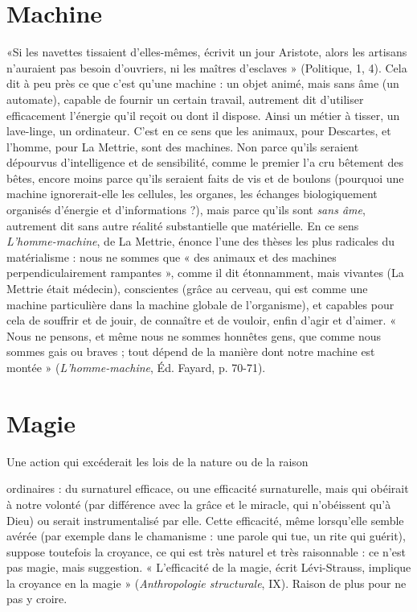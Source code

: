 \section{Machine}
«Si les navettes tissaient d’elles-mêmes, écrivit un jour Aristote,
alors les artisans n'auraient pas besoin d’ouvriers, ni les
maîtres d'esclaves » (Politique, 1, 4). Cela dit à peu près ce que c’est qu’une
machine : un objet animé, mais sans âme (un automate), capable de fournir un
certain travail, autrement dit d’utiliser efficacement l'énergie qu’il reçoit ou
dont il dispose. Ainsi un métier à tisser, un lave-linge, un ordinateur. C’est en
ce sens que les animaux, pour Descartes, et l’homme, pour La Mettrie, sont des
machines. Non parce qu’ils seraient dépourvus d’intelligence et de sensibilité,
comme le premier l’a cru bêtement des bêtes, encore moins parce qu’ils seraient
faits de vis et de boulons (pourquoi une machine ignorerait-elle les cellules, les
organes, les échanges biologiquement organisés d'énergie et d’informations ?),
mais parce qu'ils sont {\it sans âme}, autrement dit sans autre réalité substantielle
que matérielle. En ce sens {\it L'homme-machine}, de La Mettrie, énonce l’une des
thèses les plus radicales du matérialisme : nous ne sommes que « des animaux
et des machines perpendiculairement rampantes », comme il dit étonnamment,
mais vivantes (La Mettrie était médecin), conscientes (grâce au cerveau, qui est
comme une machine particulière dans la machine globale de l'organisme), et
capables pour cela de souffrir et de jouir, de connaître et de vouloir, enfin d’agir
et d'aimer. « Nous ne pensons, et même nous ne sommes honnêtes gens, que
comme nous sommes gais ou braves ; tout dépend de la manière dont notre
machine est montée » ({\it L'homme-machine}, Éd. Fayard, p. 70-71).

\section{Magie}
Une action qui excéderait les lois de la nature ou de la raison

ordinaires : du surnaturel efficace, ou une efficacité surnaturelle,
mais qui obéirait à notre volonté (par différence avec la grâce et le miracle, qui
n’obéissent qu’à Dieu) ou serait instrumentalisé par elle. Cette efficacité, même
lorsqu’elle semble avérée (par exemple dans le chamanisme : une parole qui tue,
un rite qui guérit), suppose toutefois la croyance, ce qui est très naturel et très
raisonnable : ce n’est pas magie, mais suggestion. « L'efficacité de la magie,
écrit Lévi-Strauss, implique la croyance en la magie » ({\it Anthropologie structurale},
IX). Raison de plus pour ne pas y croire.

